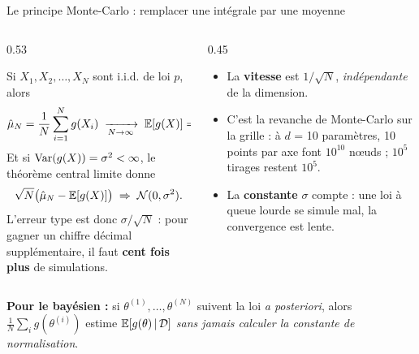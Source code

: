 \begin{frame}{Le principe Monte-Carlo : remplacer une intégrale par une moyenne}
\small
\begin{columns}[t]
\begin{column}{0.53\textwidth}
\begin{ebox}
Si $X_1, X_2, \dots, X_N$ sont i.i.d. de loi $p$, alors
\[
\hat\mu_N = \frac{1}{N}\sum_{i=1}^{N} g(X_i)
\;\xrightarrow[N \to \infty]{}\; \mathbb{E}[g(X)] = \int g(x)\,p(x)\,\mathrm{d}x .
\]
Et si $\mathrm{Var}(g(X)) = \sigma^2 < \infty$, le théorème central limite donne
\[
\sqrt{N}\big(\hat\mu_N - \mathbb{E}[g(X)]\big) \;\Rightarrow\; \mathcal{N}(0, \sigma^2).
\]
L'erreur type est donc $\sigma/\sqrt{N}$ : pour gagner un chiffre décimal
supplémentaire, il faut \textbf{cent fois plus} de simulations.
\end{ebox}
\end{column}
\begin{column}{0.45\textwidth}
\begin{kbox}
\begin{itemize}
  \item La \textbf{vitesse} est $1/\sqrt{N}$, \emph{indépendante} de la dimension.
  \item C'est la revanche de Monte-Carlo sur la grille : à $d$ = 10 paramètres,
        10 points par axe font $10^{10}$ nœuds ; $10^5$ tirages restent $10^5$.
  \item La \textbf{constante} $\sigma$ compte : une loi à queue lourde se
        simule mal, la convergence est lente.
\end{itemize}
\end{kbox}
\end{column}
\end{columns}
\vspace{1mm}
\begin{tcolorbox}[colback=byLight,colframe=byGrey!55,arc=2mm,width=.96\textwidth]
\small\centering
\textbf{Pour le bayésien :} si $\theta^{(1)},\dots,\theta^{(N)}$ suivent la loi
\emph{a posteriori}, alors $\frac{1}{N}\sum_i g(\theta^{(i)})$ estime
$\mathbb{E}[g(\theta) \,\vert\, \mathcal{D}]$ \emph{sans jamais calculer la constante de normalisation}.
\end{tcolorbox}
\end{frame}

